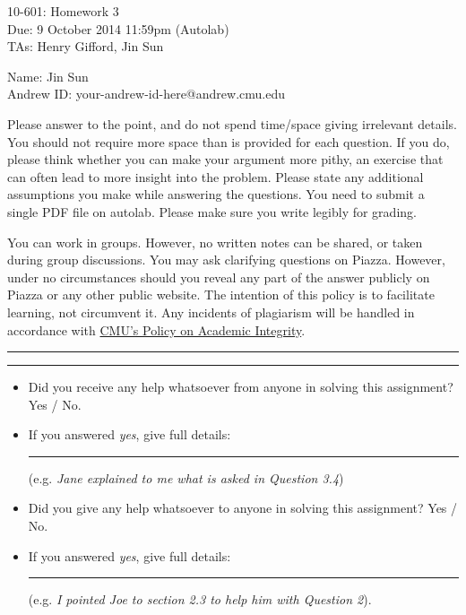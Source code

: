 \documentclass[11pt]{article}
\makeatletter
\newif\ifprint
\newcommand{\mycoursenum}{10-601}
\newcommand{\myhwnum}{3}
\newcommand{\myname}{Jin Sun}
\newcommand{\myandrew}{your-andrew-id-here@andrew.cmu.edu}
\newcommand{\myfirstta}{Henry Gifford}
\newcommand{\mysecondta}{Jin Sun}
\newcommand{\question}[2] {\vspace{.25in} \hrule\vspace{0.5em} \noindent{\bf #1: #2} \vspace{0.5em} \hrule \vspace{.10in}}
\makeatother
\begin{document}
\medskip

\thispagestyle{plain}
\begin{center}
{\Large \mycoursenum: Homework \myhwnum} \\
Due: 9 October 2014 11:59pm (Autolab) \\
TAs: \myfirstta, \mysecondta \\
\medskip
\ifprint
Name: \rule{0.5\textwidth}{.4pt} \\
Andrew ID: \rule{0.45\textwidth}{.4pt} \\
\else
Name: \myname \\
Andrew ID: \myandrew \\
\fi
\end{center}

Please answer to the point, and do not spend time/space giving irrelevant details. You should not require more space than is provided for each question. If you do, please think whether you can make your argument more pithy, an exercise that can often lead to more insight into the problem. Please state any additional assumptions you make while answering the questions. You need to submit a single PDF file on autolab. Please make sure you write legibly for grading.

You can work in groups. However, no written notes can be shared, or taken during group discussions. You may ask clarifying questions on Piazza. However, under no circumstances should you reveal any part of the answer publicly on Piazza or any other public website. The intention of this policy is to facilitate learning, not circumvent it. Any incidents of plagiarism will be handled in accordance with \href{http://www.cmu.edu/policies/documents/Academic%20Integrity.htm}{CMU's Policy on Academic Integrity}.


\question{$\star$}{Code of Conduct Declaration}

\begin{itemize}
	\item Did you receive any help whatsoever from anyone in solving this assignment? Yes / No.
	\item If you answered \emph{yes}, give full details: \rule{0.4\textwidth}{.4pt} (e.g. \emph{Jane explained to me what is asked in Question 3.4})
	\item Did you give any help whatsoever to anyone in solving this assignment? Yes / No.
	\item If you answered \emph{yes}, give full details: \rule{0.4\textwidth}{.4pt} (e.g. \emph{I pointed Joe to section 2.3 to help him with Question 2}).
\end{itemize}
\end{document}
